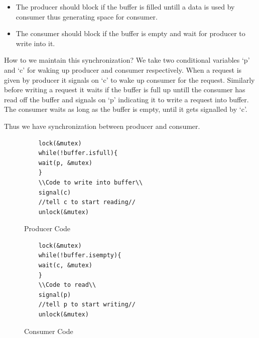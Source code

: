 \documentclass[12pt]{article}
\begin{document}
\begin{itemize}[topsep=0pt, partopsep=0pt, itemsep=0pt, parsep=0pt]
    \item The producer should block if the buffer is filled untill a data is used by consumer thus generating space for consumer. 
    \item The consumer should block if the buffer is empty and wait for producer to write into it. 
\end{itemize}

How to we maintain this synchronization? We take two conditional variables `p' and `c' for waking up producer and consumer respectively. 
When a request is given by producer it signals on `c' to wake up consumer for the request. Similarly before writing a request it waits if the buffer is full up untill the 
consumer has read off the buffer and signals on `p' indicating it to write a request into buffer. The consumer waits as long as the buffer is empty, until it gets signalled by `c'.

Thus we have synchronization between producer and consumer. 
\begin{figure}[H]
\begin{minipage}{.5\textwidth}
\begin{tcolorbox}[colback=red!5!white,colframe=red!75!black]
\begin{verbatim}
    lock(&mutex)
    while(!buffer.isfull){
    wait(p, &mutex)
    }
    \\Code to write into buffer\\
    signal(c)
    //tell c to start reading//
    unlock(&mutex)
\end{verbatim}
\end{tcolorbox}
\caption{Producer Code}
\end{minipage}
\hspace{0.05\textwidth}
\begin{minipage}{.5\textwidth}
\begin{tcolorbox}[colback=blue!5!white,colframe=blue!75!black]
\begin{verbatim}
    lock(&mutex)
    while(!buffer.isempty){
    wait(c, &mutex)
    }
    \\Code to read\\
    signal(p)
    //tell p to start writing//
    unlock(&mutex)
\end{verbatim}
\end{tcolorbox}
\caption{Consumer Code}
\end{minipage}
\end{figure}
\end{document}
